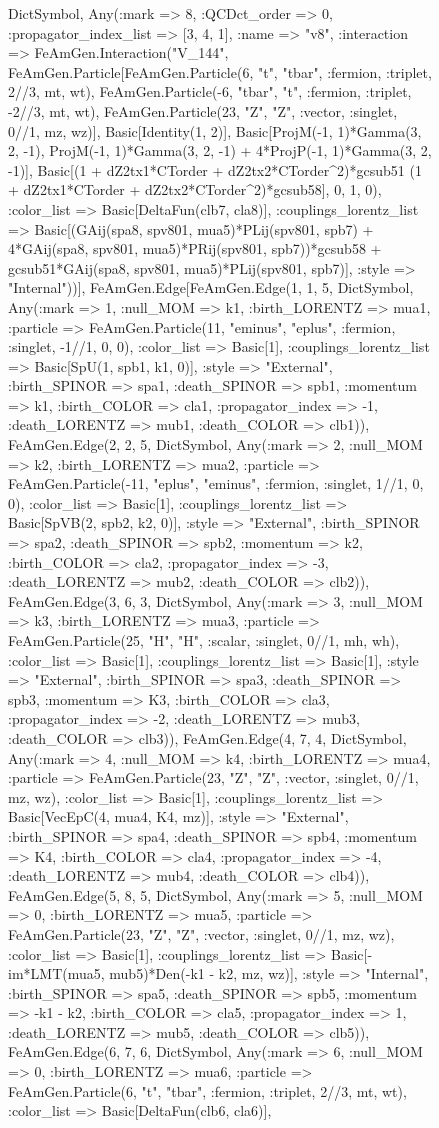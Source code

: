 \documentclass{revtex4}
\begin{document}
\begin{figure}[!htb]
\begin{center}
{Dict{Symbol, Any}(:mark => 8, :QCDct_order => 0, :propagator_index_list => [3, 4, 1], :name => "v8", :interaction => FeAmGen.Interaction("V_144", FeAmGen.Particle[FeAmGen.Particle(6, "t", "tbar", :fermion, :triplet, 2//3, mt, wt), FeAmGen.Particle(-6, "tbar", "t", :fermion, :triplet, -2//3, mt, wt), FeAmGen.Particle(23, "Z", "Z", :vector, :singlet, 0//1, mz, wz)], Basic[Identity(1, 2)], Basic[ProjM(-1, 1)*Gamma(3, 2, -1), ProjM(-1, 1)*Gamma(3, 2, -1) + 4*ProjP(-1, 1)*Gamma(3, 2, -1)], Basic[(1 + dZ2tx1*CTorder + dZ2tx2*CTorder^2)*gcsub51 (1 + dZ2tx1*CTorder + dZ2tx2*CTorder^2)*gcsub58], 0, 1, 0), :color_list => Basic[DeltaFun(clb7, cla8)], :couplings_lorentz_list => Basic[(GAij(spa8, spv801, mua5)*PLij(spv801, spb7) + 4*GAij(spa8, spv801, mua5)*PRij(spv801, spb7))*gcsub58 + gcsub51*GAij(spa8, spv801, mua5)*PLij(spv801, spb7)], :style => "Internal"))], FeAmGen.Edge[FeAmGen.Edge(1, 1, 5, Dict{Symbol, Any}(:mark => 1, :null_MOM => k1, :birth_LORENTZ => mua1, :particle => FeAmGen.Particle(11, "eminus", "eplus", :fermion, :singlet, -1//1, 0, 0), :color_list => Basic[1], :couplings_lorentz_list => Basic[SpU(1, spb1, k1, 0)], :style => "External", :birth_SPINOR => spa1, :death_SPINOR => spb1, :momentum => k1, :birth_COLOR => cla1, :propagator_index => -1, :death_LORENTZ => mub1, :death_COLOR => clb1)), FeAmGen.Edge(2, 2, 5, Dict{Symbol, Any}(:mark => 2, :null_MOM => k2, :birth_LORENTZ => mua2, :particle => FeAmGen.Particle(-11, "eplus", "eminus", :fermion, :singlet, 1//1, 0, 0), :color_list => Basic[1], :couplings_lorentz_list => Basic[SpVB(2, spb2, k2, 0)], :style => "External", :birth_SPINOR => spa2, :death_SPINOR => spb2, :momentum => k2, :birth_COLOR => cla2, :propagator_index => -3, :death_LORENTZ => mub2, :death_COLOR => clb2)), FeAmGen.Edge(3, 6, 3, Dict{Symbol, Any}(:mark => 3, :null_MOM => k3, :birth_LORENTZ => mua3, :particle => FeAmGen.Particle(25, "H", "H", :scalar, :singlet, 0//1, mh, wh), :color_list => Basic[1], :couplings_lorentz_list => Basic[1], :style => "External", :birth_SPINOR => spa3, :death_SPINOR => spb3, :momentum => K3, :birth_COLOR => cla3, :propagator_index => -2, :death_LORENTZ => mub3, :death_COLOR => clb3)), FeAmGen.Edge(4, 7, 4, Dict{Symbol, Any}(:mark => 4, :null_MOM => k4, :birth_LORENTZ => mua4, :particle => FeAmGen.Particle(23, "Z", "Z", :vector, :singlet, 0//1, mz, wz), :color_list => Basic[1], :couplings_lorentz_list => Basic[VecEpC(4, mua4, K4, mz)], :style => "External", :birth_SPINOR => spa4, :death_SPINOR => spb4, :momentum => K4, :birth_COLOR => cla4, :propagator_index => -4, :death_LORENTZ => mub4, :death_COLOR => clb4)), FeAmGen.Edge(5, 8, 5, Dict{Symbol, Any}(:mark => 5, :null_MOM => 0, :birth_LORENTZ => mua5, :particle => FeAmGen.Particle(23, "Z", "Z", :vector, :singlet, 0//1, mz, wz), :color_list => Basic[1], :couplings_lorentz_list => Basic[-im*LMT(mua5, mub5)*Den(-k1 - k2, mz, wz)], :style => "Internal", :birth_SPINOR => spa5, :death_SPINOR => spb5, :momentum => -k1 - k2, :birth_COLOR => cla5, :propagator_index => 1, :death_LORENTZ => mub5, :death_COLOR => clb5)), FeAmGen.Edge(6, 7, 6, Dict{Symbol, Any}(:mark => 6, :null_MOM => 0, :birth_LORENTZ => mua6, :particle => FeAmGen.Particle(6, "t", "tbar", :fermion, :triplet, 2//3, mt, wt), :color_list => Basic[DeltaFun(clb6, cla6)], }
\end{center}
\end{figure}
\end{document}
